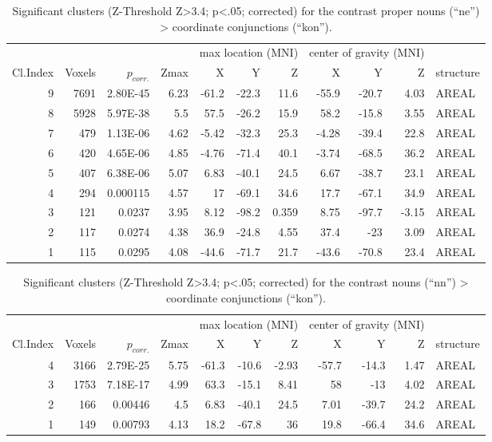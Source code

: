 \documentclass[10pt,a4paper,onecolumn]{article}
\begin{document}
\begin{table*}[t]
\caption{Significant clusters (Z-Threshold Z>3.4; p<.05; corrected) for the contrast proper nouns (``ne'') > coordinate conjunctions (``kon'').}
\label{tab:cope3}
\begin{tabular}{rrrrrrrrrrp{3cm}}
\toprule
& & & & \multicolumn{3}{r}{max location (MNI)} & \multicolumn{3}{r}{center of gravity (MNI)} &
\\ \cmidrule{5-7} \cmidrule{8-10}
Cl.\-Index & Voxels & $p_{corr.}$ & Z\-max & X & Y & Z  & X & Y & Z & structure \\
\midrule
9 & 7691 & 2.80E-45 & 6.23 & -61.2 & -22.3 & 11.6 & -55.9 & -20.7 & 4.03 & AREAL \\
8 & 5928 & 5.97E-38 & 5.5 & 57.5 & -26.2 & 15.9 & 58.2 & -15.8 & 3.55 & AREAL \\
7 & 479 & 1.13E-06 & 4.62 & -5.42 & -32.3 & 25.3 & -4.28 & -39.4 & 22.8 & AREAL \\
6 & 420 & 4.65E-06 & 4.85 & -4.76 & -71.4 & 40.1 & -3.74 & -68.5 & 36.2 & AREAL \\
5 & 407 & 6.38E-06 & 5.07 & 6.83 & -40.1 & 24.5 & 6.67 & -38.7 & 23.1 & AREAL \\
4 & 294 & 0.000115 & 4.57 & 17 & -69.1 & 34.6 & 17.7 & -67.1 & 34.9 & AREAL \\
3 & 121 & 0.0237 & 3.95 & 8.12 & -98.2 & 0.359 & 8.75 & -97.7 & -3.15 & AREAL \\
2 & 117 & 0.0274 & 4.38 & 36.9 & -24.8 & 4.55 & 37.4 & -23 & 3.09 & AREAL \\
1 & 115 & 0.0295 & 4.08 & -44.6 & -71.7 & 21.7 & -43.6 & -70.8 & 23.4 & AREAL \\
\bottomrule
\end{tabular}

\end{table*}


\begin{table*}[t]
    \caption{Significant clusters (Z-Threshold Z>3.4; p<.05; corrected) for the contrast nouns (``nn'') > coordinate conjunctions (``kon'').}
\label{tab:cope5}
\begin{tabular}{rrrrrrrrrrp{3cm}}
\toprule
& & & & \multicolumn{3}{r}{max location (MNI)} & \multicolumn{3}{r}{center of gravity (MNI)} &
\\ \cmidrule{5-7} \cmidrule{8-10}
Cl.\-Index & Voxels & $p_{corr.}$ & Z\-max & X & Y & Z  & X & Y & Z & structure \\
\midrule
4 & 3166 & 2.79E-25 & 5.75 & -61.3 & -10.6 & -2.93 & -57.7 & -14.3 & 1.47 & AREAL \\
3 & 1753 & 7.18E-17 & 4.99 & 63.3 & -15.1 & 8.41 & 58 & -13 & 4.02 & AREAL \\
2 & 166 & 0.00446 & 4.5 & 6.83 & -40.1 & 24.5 & 7.01 & -39.7 & 24.2 & AREAL \\
1 & 149 & 0.00793 & 4.13 & 18.2 & -67.8 & 36 & 19.8 & -66.4 & 34.6 & AREAL \\
\bottomrule
\end{tabular}
\end{table*}
\end{document}

